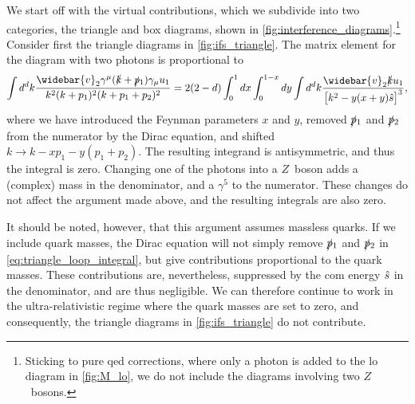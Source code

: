 We start off with the virtual contributions, which we subdivide into two categories, the triangle and box diagrams, shown in \cref{fig:interference_diagrams}.\footnote{Sticking to pure \gls{qed} corrections, where only a photon is added to the \gls{lo} diagram in \cref{fig:M_lo}, we do not include the diagrams involving two $Z$~bosons.}
Consider first the triangle diagrams in \cref{fig:ifs_triangle}. The matrix element for the diagram with two photons is proportional to
\begin{equation}
    \int d^dk \frac{\widebar{v}_2  \gamma^\mu(\kslash+\poneslash)\gamma_\mu u_1}{k^2(k+p_1)^2(k+p_1+p_2)^2}
    = 2(2-d) \int_0^1 dx \int_0^{1-x} dy \int d^dk \frac{\widebar{v}_2 \kslash u_1}{\bigl[
        k^2 - y(x+y)\shat
    \bigr]^3},
    \label{eq:triangle_loop_integral}
\end{equation}
where we have introduced the Feynman parameters $x$ and $y$, removed $\slashed{p}{}_1$ and $\slashed{p}{}_2$ from the numerator by the Dirac equation, and shifted $k \to k-xp_1-y(p_1+p_2)$.
The resulting integrand is antisymmetric, and thus the integral is zero.
Changing one of the photons into a $Z$~boson adds a (complex) mass in the denominator, and a $\gamma^5$ to the numerator. These changes do not affect the argument made above, and the resulting integrals are also zero.

It should be noted, however, that this argument assumes massless quarks. If we include quark masses, the Dirac equation will not simply remove $\slashed{p}{}_1$ and $\slashed{p}{}_2$ in \cref{eq:triangle_loop_integral}, but give contributions proportional to the quark masses.
These contributions are, nevertheless, suppressed by the \gls{com} energy $\hat{s}$ in the denominator, and are thus negligible.
We can therefore continue to work in the ultra-relativistic regime where the quark masses are set to zero, and consequently, the triangle diagrams in \cref{fig:ifs_triangle} do not contribute.

